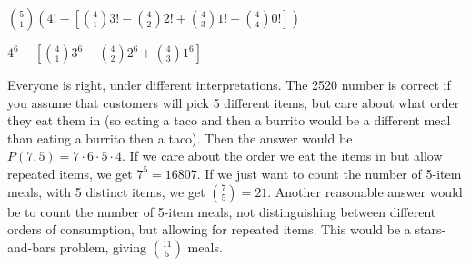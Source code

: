 \protect \documentclass [10pt]{exam}
\renewenvironment{Ans}[1]{\setcounter{question}{#1}\addtocounter{question}{-1}\question }{}
\begin{document}
\begin{questions}
\begin{Ans}{21}
\begin{parts}
	\end{parts}
	
\end{Ans}
\begin{Ans}{22}
		 ${5 \choose 1}\left( 4! - \left[{4 \choose 1}3! - {4 \choose 2}2! + {4 \choose 3} 1! - {4 \choose 4} 0!\right] \right)$
	
\end{Ans}
\begin{Ans}{23}
		$4^6 - \left[{4 \choose 1}3^6 - {4 \choose 2}2^6 + {4 \choose 3} 1^6 \right]$
	
\end{Ans}
\begin{Ans}{24}
\end{Ans}
\begin{Ans}{25}
  Everyone is right, under different interpretations.  The 2520 number is correct if you assume that customers will pick 5 different items, but care about what order they eat them in (so eating a taco and then a burrito would be a different meal than eating a burrito then a taco).  Then the answer would be $P(7,5) = 7\cdot 6 \cdot 5 \cdot 4$.  If we care about the order we eat the items in but allow repeated items, we get $7^5 = 16807$.  If we just want to count the number of 5-item meals, with 5 distinct items, we get ${7 \choose 5} = 21$.  Another reasonable answer would be to count the number of 5-item meals, not distinguishing between different orders of consumption, but allowing for repeated items.  This would be a stars-and-bars problem, giving ${11 \choose 5}$ meals.
\end{Ans}
 \protect \end {questions} \par \protect 
\end{document}
